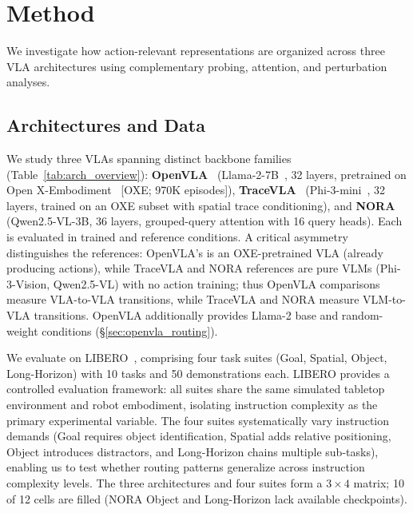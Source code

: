 \section{Method}
\label{sec:method}

We investigate how action-relevant representations are organized across three VLA architectures using complementary probing, attention, and perturbation analyses.

\subsection{Architectures and Data}
\label{sec:arch_data}

We study three VLAs spanning distinct backbone families (Table~\ref{tab:arch_overview}):
\textbf{OpenVLA}~\cite{kim2024_openvla,karamcheti2024} (Llama-2-7B~\cite{touvron2023_llama2}, 32 layers, pretrained on Open X-Embodiment~\cite{padalkar2023_oxe} [OXE; 970K episodes]),
\textbf{TraceVLA}~\cite{zheng2024tracevla} (Phi-3-mini~\cite{abdin2024phi3}, 32 layers, trained on an OXE subset with spatial trace conditioning), and
\textbf{NORA}~\cite{hung2025nora} (Qwen2.5-VL-3B, 36 layers, grouped-query attention with 16 query heads).
Each is evaluated in trained and reference conditions.
A critical asymmetry distinguishes the references: OpenVLA's is an OXE-pretrained VLA (already producing actions), while TraceVLA and NORA references are pure VLMs (Phi-3-Vision, Qwen2.5-VL) with no action training; thus OpenVLA comparisons measure VLA-to-VLA transitions, while TraceVLA and NORA measure VLM-to-VLA transitions.
OpenVLA additionally provides Llama-2 base and random-weight conditions (\S\ref{sec:openvla_routing}).

We evaluate on LIBERO~\cite{liu2023_libero}, comprising four task suites (Goal, Spatial, Object, Long-Horizon) with 10 tasks and 50 demonstrations each.
LIBERO provides a controlled evaluation framework: all suites share the same simulated tabletop environment and robot embodiment, isolating instruction complexity as the primary experimental variable.
The four suites systematically vary instruction demands (Goal requires object identification, Spatial adds relative positioning, Object introduces distractors, and Long-Horizon chains multiple sub-tasks), enabling us to test whether routing patterns generalize across instruction complexity levels.
The three architectures and four suites form a $3 \times 4$ matrix; 10 of 12 cells are filled (NORA Object and Long-Horizon lack available checkpoints).

